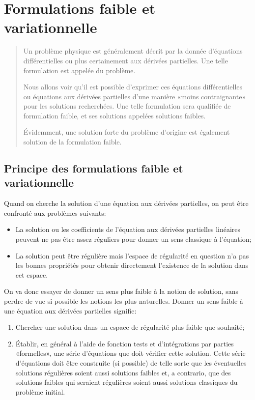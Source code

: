 \chapter{Formulations faible et variationnelle}\label{Ch_FFaible}
\begin{abstract}
Un problème physique est généralement décrit par la donnée d'équations différentielles ou plus certainement aux dérivées partielles. Une telle formulation est appelée  du problème.

Nous allons voir qu'il est possible d'exprimer ces équations différentielles ou équations aux dérivées partielles d'une manière «moins contraignante» pour les solutions recherchées. Une telle formulation sera qualifiée de formulation faible, et ses solutions appelées solutions faibles.

Évidemment, une solution forte du problème d'origine est également solution de la formulation faible.
\end{abstract}


\medskip
\section{Principe des formulations faible et variationnelle}
Quand on cherche la solution d'une équation aux dérivées partielles, on peut être confronté aux problèmes suivants:
\begin{itemize}
  \item La solution ou les coefficients de l'équation aux dérivées partielles linéaires peuvent ne pas être assez réguliers pour donner un sens classique à l'équation;
  \item La solution peut être régulière mais l'espace de régularité en question n'a pas les bonnes propriétés pour obtenir directement l'existence de la solution dans cet espace.
\end{itemize}


\medskip
On va donc essayer de donner un sens plus faible à la notion de solution, sans perdre de vue si possible les notions les plus naturelles. Donner un sens faible à une équation aux dérivées partielles signifie:
\begin{enumerate}
  \item Chercher une solution dans un espace de régularité plus faible que souhaité;
  \item Établir, en général à l'aide de fonction tests et d'intégrations par parties «formelles», une série d'équations que doit vérifier cette solution. Cette série  d'équations doit être construite (si possible) de telle sorte que les éventuelles 	solutions régulières soient aussi solutions faibles et, a contrario, que des solutions faibles qui seraient régulières soient aussi solutions classiques du problème initial.
\end{enumerate}


